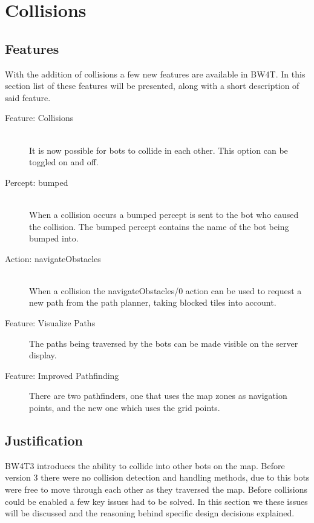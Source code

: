 \documentclass{article}
\begin{document}
\section*{Collisions}
\subsection*{Features}
With the addition of collisions a few new features are available in BW4T. In this section list of these features will be presented, along with a short description of said feature.

\begin{description}
	\item[Feature: Collisions] \hfill \\
		It is now possible for bots to collide in each other. This option can be toggled on and off.
	\item[Percept: bumped] \hfill \\
		When a collision occurs a bumped percept is sent to the bot who caused the collision. The bumped percept contains the name of the bot being bumped into.
	\item[Action: navigateObstacles] \hfill \\
		When a collision the navigateObstacles/0 action can be used to request a new path from the path planner, taking blocked tiles into account.
	\item[Feature: Visualize Paths]
		The paths being traversed by the bots can be made visible on the server display. 
	\item[Feature: Improved Pathfinding]
		There are two pathfinders, one that uses the map zones as navigation points, and the new one which uses the grid points. 
\end{description}
		
\subsection*{Justification}
BW4T3 introduces the ability to collide into other bots on the map. Before version 3 there were no collision detection and handling methods, due to this bots were free to move through each other as they traversed the map. Before collisions could be enabled a few key issues had to be solved. In this section we these issues will be discussed and the reasoning behind specific design decisions explained. 
\end{document}
